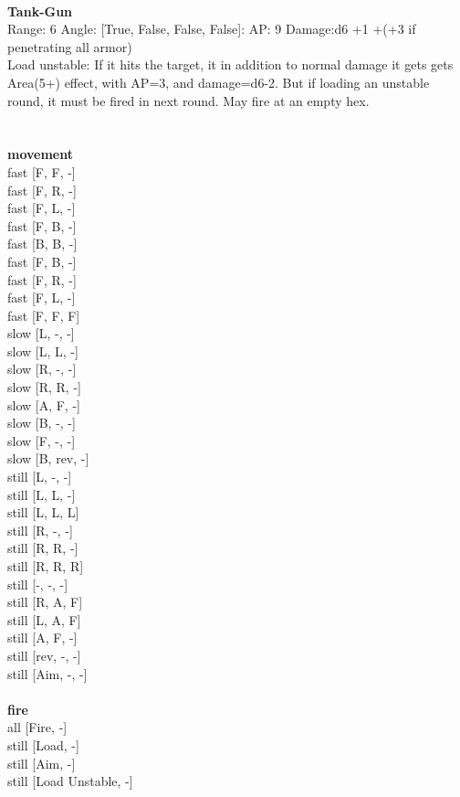 \ \\
{\bf Tank-Gun } \\



Range: 6  Angle: [True, False, False, False]: AP: 9 Damage:d6 +1 +(+3 if penetrating all armor) \\
Load unstable: If it hits the target, it in addition to normal damage it gets gets Area(5+) effect, with AP=3, and damage=d6-2. But if loading an unstable round, it must be fired in next round. May fire at an empty hex.\\ 




 
\ \\



\ \\ {\bf movement } \\
fast [F, F, -] \\
fast [F, R, -] \\
fast [F, L, -] \\
fast [F, B, -] \\
fast [B, B, -] \\
fast [F, B, -] \\
fast [F, R, -] \\
fast [F, L, -] \\
fast [F, F, F] \\
slow [L, -, -] \\
slow [L, L, -] \\
slow [R, -, -] \\
slow [R, R, -] \\
slow [A, F, -] \\
slow [B, -, -] \\
slow [F, -, -] \\
slow [B, rev, -] \\
still [L, -, -] \\
still [L, L, -] \\
still [L, L, L] \\
still [R, -, -] \\
still [R, R, -] \\
still [R, R, R] \\
still [-, -, -] \\
still [R, A, F] \\
still [L, A, F] \\
still [A, F, -] \\
still [rev, -, -] \\
still [Aim, -, -] \\
\ \\ {\bf fire } \\
all [Fire, -] \\
still [Load, -] \\
still [Aim, -] \\
still [Load Unstable, -] \\


